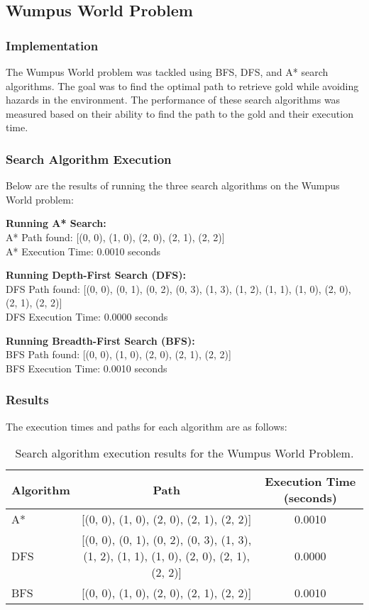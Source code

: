 \documentclass[12pt]{article}
\begin{document}
\subsection{Wumpus World Problem}
\subsubsection{Implementation}
The Wumpus World problem was tackled using BFS, DFS, and A* search algorithms. The goal was to find the optimal path to retrieve gold while avoiding hazards in the environment. The performance of these search algorithms was measured based on their ability to find the path to the gold and their execution time.

\subsubsection{Search Algorithm Execution}
Below are the results of running the three search algorithms on the Wumpus World problem:

\textbf{Running A* Search:}\\
A* Path found: [(0, 0), (1, 0), (2, 0), (2, 1), (2, 2)] \\
A* Execution Time: 0.0010 seconds

\textbf{Running Depth-First Search (DFS):}\\
DFS Path found: [(0, 0), (0, 1), (0, 2), (0, 3), (1, 3), (1, 2), (1, 1), (1, 0), (2, 0), (2, 1), (2, 2)] \\
DFS Execution Time: 0.0000 seconds

\textbf{Running Breadth-First Search (BFS):}\\
BFS Path found: [(0, 0), (1, 0), (2, 0), (2, 1), (2, 2)] \\
BFS Execution Time: 0.0010 seconds

\subsubsection{Results}
The execution times and paths for each algorithm are as follows:


\begin{table}[h!]
    \centering
    \begin{tabular}{|l|c|c|}
        \hline
        Algorithm & Path & Execution Time (seconds) \\
        \hline
        A* & [(0, 0), (1, 0), (2, 0), (2, 1), (2, 2)] & 0.0010 \\
        DFS & [(0, 0), (0, 1), (0, 2), (0, 3), (1, 3), (1, 2), (1, 1), (1, 0), (2, 0), (2, 1), (2, 2)] & 0.0000 \\
        BFS & [(0, 0), (1, 0), (2, 0), (2, 1), (2, 2)] & 0.0010 \\
        \hline
    \end{tabular}
    \caption{Search algorithm execution results for the Wumpus World Problem.}
    \label{tab:wumpus_search_performance}
\end{table}
\end{document}
